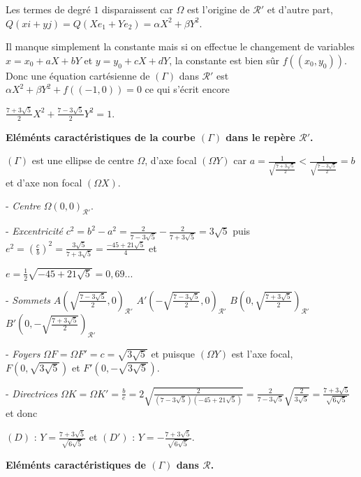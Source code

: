 {\begin{enumerate}
{Les termes de degré $1$ disparaissent car $\Omega$ est l'origine de $\mathcal{R}'$ et d'autre part, $Q(xi+yj) = Q(Xe_1+Ye_2) =\alpha X^2+\beta Y^2$.

Il manque simplement la constante mais si on effectue le changement de variables $x = x_0+aX+bY$ et $y = y_0+cX+dY$, la constante est bien sûr $f((x_0,y_0))$. Donc une équation cartésienne de $(\Gamma)$ dans $\mathcal{R}'$ est $\alpha X^2+\beta Y^2+f((-1,0))= 0$ ce qui s'écrit encore

\begin{center}
$\frac{7+3\sqrt{5}}{2}X^2+\frac{7-3\sqrt{5}}{2}Y^2 = 1$.
\end{center}

\textbf{Eléménts caractéristiques de la courbe $(\Gamma)$ dans le repère $\mathcal{R}'$.}

$(\Gamma)$ est une ellipse de centre $\Omega$, d'axe focal $(\Omega Y)$ car $a=\frac{1}{\sqrt{\frac{7+3\sqrt{5}}{2}}}<\frac{1}{\sqrt{\frac{7-3\sqrt{5}}{2}}}=b$ et d'axe non focal $(\Omega X)$.

- \emph{Centre} $\Omega(0,0)_{\mathcal{R}'}$.
 
 
- \emph{Excentricité} $c^2=b^2-a^2 =\frac{2}{7-3\sqrt{5}}-\frac{2}{7+3\sqrt{5}}=3\sqrt{5}$ puis $e^2 =\left(\frac{c}{b}\right)^2=\frac{3\sqrt{5}}{7+3\sqrt{5}}=\frac{-45+21\sqrt{5}}{4}$ et 

$e=\frac{1}{2}\sqrt{-45+21\sqrt{5}}= 0,69...$
 
- \emph{Sommets} $A\left(\sqrt{\frac{7-3\sqrt{5}}{2}},0\right)_{\mathcal{R}'}$  $A'\left(-\sqrt{\frac{7-3\sqrt{5}}{2}},0\right)_{\mathcal{R}'}$  $B\left(0,\sqrt{\frac{7+3\sqrt{5}}{2}}\right)_{\mathcal{R}'}$  $B'\left(0,-\sqrt{\frac{7+3\sqrt{5}}{2}}\right)_{\mathcal{R}'}$ 

- \emph{Foyers} $\Omega F =\Omega F'=c=\sqrt{3\sqrt{5}}$  et puisque $(\Omega Y)$ est l'axe focal, $F(0,\sqrt{3\sqrt{5}})$ et $F'(0,-\sqrt{3\sqrt{5}})$. 

- \emph{Directrices} $\Omega K =\Omega K'=\frac{b}{e}=2\sqrt{\frac{2}{(7-3\sqrt{5})(-45+21\sqrt{5})}}=\frac{2}{7-3\sqrt{5}}\sqrt{\frac{2}{3\sqrt{5}}}=\frac{7+3\sqrt{5}}{\sqrt{6\sqrt{5}}}$ et donc 

$(D)$ : $Y =\frac{7+3\sqrt{5}}{\sqrt{6\sqrt{5}}}$ et $(D')$ : $Y = -\frac{7+3\sqrt{5}}{\sqrt{6\sqrt{5}}}$. 

\textbf{Eléménts caractéristiques de $(\Gamma)$ dans $\mathcal{R}$.}

}
\end{enumerate}}
